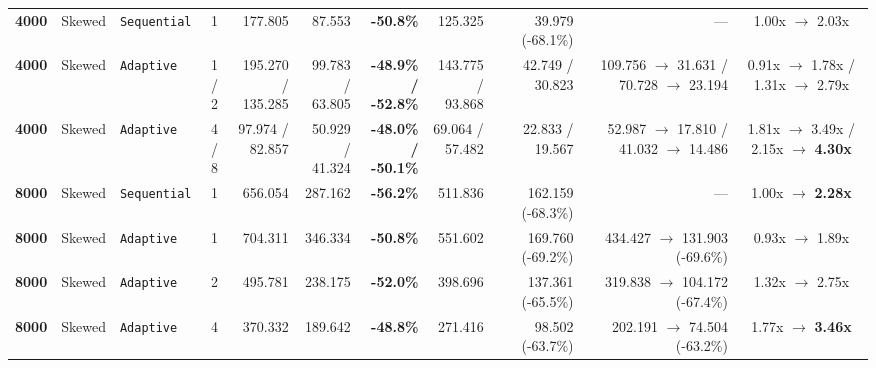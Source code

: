 \documentclass[11pt,a4paper]{article}
\renewcommand{\_}{\textunderscore\allowbreak}
\begin{document}
\begin{table}[H]
{\begin{tabular}{r l l c r r r r r r c}
\textbf{4000} & Skewed & \texttt{Sequential} & 1 & 177.805 & 87.553 & \textbf{-50.8\%} & 125.325 & 39.979 (-68.1\%) & --- & 1.00x $\to$ 2.03x \\
\textbf{4000} & Skewed & \texttt{Adaptive} & 1 / 2 & \makecell[r]{195.270 /\\ 135.285} & \makecell[r]{99.783 /\\ 63.805} & \makecell[r]{\textbf{-48.9\% /}\\ \textbf{-52.8\%}} & \makecell[r]{143.775 /\\ 93.868} & \makecell[r]{42.749 /\\ 30.823} & \makecell[r]{109.756 $\to$ 31.631 /\\ 70.728 $\to$ 23.194} & \makecell[c]{0.91x $\to$ 1.78x /\\ 1.31x $\to$ 2.79x} \\
\textbf{4000} & Skewed & \texttt{Adaptive} & 4 / 8 & \makecell[r]{97.974 /\\ 82.857} & \makecell[r]{50.929 /\\ 41.324} & \makecell[r]{\textbf{-48.0\% /}\\ \textbf{-50.1\%}} & \makecell[r]{69.064 /\\ 57.482} & \makecell[r]{22.833 /\\ 19.567} & \makecell[r]{52.987 $\to$ 17.810 /\\ 41.032 $\to$ 14.486} & \makecell[c]{1.81x $\to$ 3.49x /\\ 2.15x $\to$ \textbf{4.30x}} \\
\textbf{8000} & Skewed & \texttt{Sequential} & 1 & 656.054 & 287.162 & \textbf{-56.2\%} & 511.836 & 162.159 (-68.3\%) & --- & 1.00x $\to$ \textbf{2.28x} \\
\textbf{8000} & Skewed & \texttt{Adaptive} & 1 & 704.311 & 346.334 & \textbf{-50.8\%} & 551.602 & \makecell[r]{169.760\\ (-69.2\%)} & \makecell[r]{434.427 $\to$ 131.903\\ (-69.6\%)} & 0.93x $\to$ 1.89x \\
\textbf{8000} & Skewed & \texttt{Adaptive} & 2 & 495.781 & 238.175 & \textbf{-52.0\%} & 398.696 & \makecell[r]{137.361\\ (-65.5\%)} & \makecell[r]{319.838 $\to$ 104.172\\ (-67.4\%)} & 1.32x $\to$ 2.75x \\
\textbf{8000} & Skewed & \texttt{Adaptive} & 4 & 370.332 & 189.642 & \textbf{-48.8\%} & 271.416 & \makecell[r]{98.502\\ (-63.7\%)} & \makecell[r]{202.191 $\to$ 74.504\\ (-63.2\%)} & 1.77x $\to$ \textbf{3.46x} \\

\end{tabular}}
\end{table}
\end{document}
